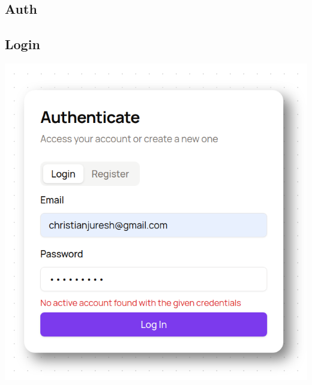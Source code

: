 \begin{appendices}
\section{Auth} \label{app:Auth}
{\centering
\subsection{Login}
\includegraphics[width=0.35\textheight]{images/login.png}

}
\end{appendices}
